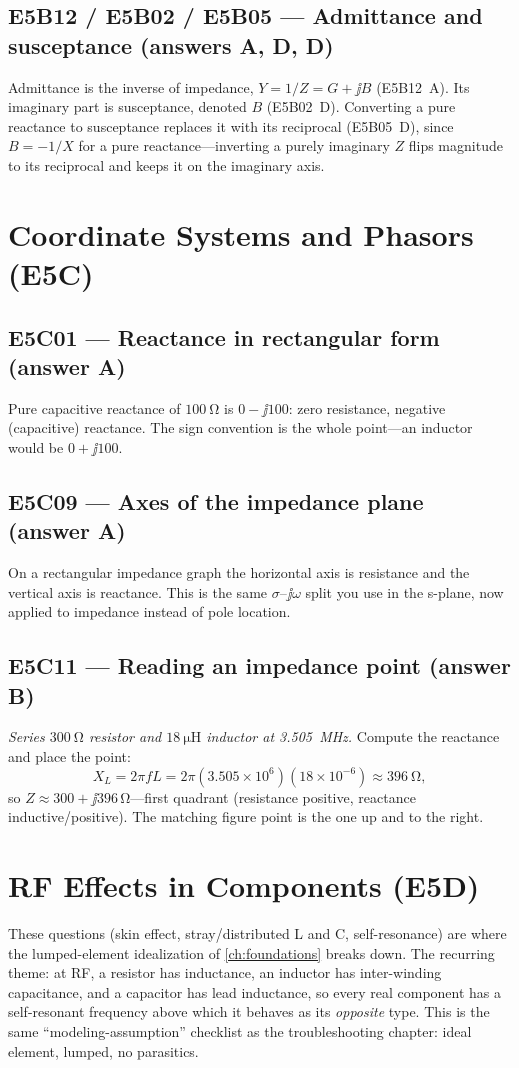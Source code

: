 \subsection*{E5B12 / E5B02 / E5B05 --- Admittance and susceptance (answers A, D, D)}
Admittance is the inverse of impedance, \(Y=1/Z=G+\jj B\) (E5B12~A). Its imaginary
part is susceptance, denoted \(B\) (E5B02~D). Converting a pure reactance to
susceptance replaces it with its reciprocal (E5B05~D), since \(B=-1/X\) for a pure
reactance---inverting a purely imaginary \(Z\) flips magnitude to its reciprocal
and keeps it on the imaginary axis.

\section{Coordinate Systems and Phasors (E5C)}

\subsection*{E5C01 --- Reactance in rectangular form (answer A)}
Pure capacitive reactance of \(\SI{100}{\ohm}\) is \(0-\jj100\): zero resistance,
negative (capacitive) reactance. The sign convention is the whole point---an
inductor would be \(0+\jj100\).

\subsection*{E5C09 --- Axes of the impedance plane (answer A)}
On a rectangular impedance graph the horizontal axis is resistance and the
vertical axis is reactance. This is the same \(\sigma\)--\(\jj\omega\) split you
use in the s-plane, now applied to impedance instead of pole location.

\subsection*{E5C11 --- Reading an impedance point (answer B)}
\emph{Series \(\SI{300}{\ohm}\) resistor and \(\SI{18}{\micro\henry}\) inductor at
\SI{3.505}{\mega\hertz}.} Compute the reactance and place the point:
\[
X_L=2\pi f L=2\pi(3.505\times10^6)(18\times10^{-6})\approx\SI{396}{\ohm},
\]
so \(Z\approx300+\jj396\,\si{\ohm}\)---first quadrant (resistance positive, reactance
inductive/positive). The matching figure point is the one up and to the right.

\section{RF Effects in Components (E5D)}
These questions (skin effect, stray/distributed L and C, self-resonance) are
where the lumped-element idealization of \cref{ch:foundations} breaks down. The
recurring theme: at RF, a resistor has inductance, an inductor has
inter-winding capacitance, and a capacitor has lead inductance, so every real
component has a self-resonant frequency above which it behaves as its
\emph{opposite} type. This is the same ``modeling-assumption'' checklist as the
troubleshooting chapter: ideal element, lumped, no parasitics.

